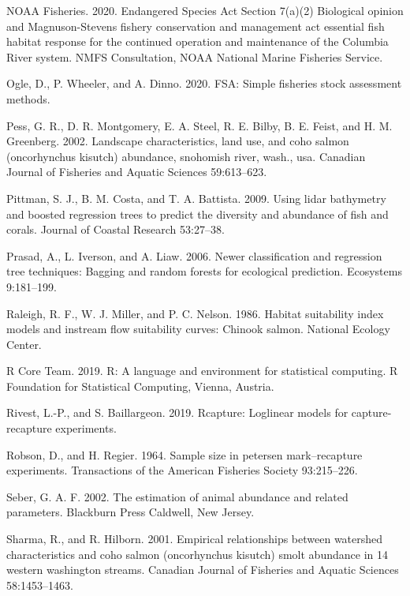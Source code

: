 \documentclass[
  12pt,
]{article}
\begin{document}
\leavevmode\hypertarget{ref-NOAA2020}{}%
NOAA Fisheries. 2020. Endangered Species Act Section 7(a)(2) Biological opinion and Magnuson-Stevens fishery conservation and management act essential fish habitat response for the continued operation and maintenance of the Columbia River system. NMFS Consultation, NOAA National Marine Fisheries Service.

\leavevmode\hypertarget{ref-R-FSA}{}%
Ogle, D., P. Wheeler, and A. Dinno. 2020. FSA: Simple fisheries stock assessment methods.

\leavevmode\hypertarget{ref-Pess2002}{}%
Pess, G. R., D. R. Montgomery, E. A. Steel, R. E. Bilby, B. E. Feist, and H. M. Greenberg. 2002. Landscape characteristics, land use, and coho salmon (oncorhynchus kisutch) abundance, snohomish river, wash., usa. Canadian Journal of Fisheries and Aquatic Sciences 59:613--623.

\leavevmode\hypertarget{ref-Pittman2009}{}%
Pittman, S. J., B. M. Costa, and T. A. Battista. 2009. Using lidar bathymetry and boosted regression trees to predict the diversity and abundance of fish and corals. Journal of Coastal Research 53:27--38.

\leavevmode\hypertarget{ref-Prasad2006}{}%
Prasad, A., L. Iverson, and A. Liaw. 2006. Newer classification and regression tree techniques: Bagging and random forests for ecological prediction. Ecosystems 9:181--199.

\leavevmode\hypertarget{ref-Raleigh1986}{}%
Raleigh, R. F., W. J. Miller, and P. C. Nelson. 1986. Habitat suitability index models and instream flow suitability curves: Chinook salmon. National Ecology Center.

\leavevmode\hypertarget{ref-Rsoftware2019}{}%
R Core Team. 2019. R: A language and environment for statistical computing. R Foundation for Statistical Computing, Vienna, Austria.

\leavevmode\hypertarget{ref-R-Rcapture}{}%
Rivest, L.-P., and S. Baillargeon. 2019. Rcapture: Loglinear models for capture-recapture experiments.

\leavevmode\hypertarget{ref-Robson1964}{}%
Robson, D., and H. Regier. 1964. Sample size in petersen mark--recapture experiments. Transactions of the American Fisheries Society 93:215--226.

\leavevmode\hypertarget{ref-Seber2002}{}%
Seber, G. A. F. 2002. The estimation of animal abundance and related parameters. Blackburn Press Caldwell, New Jersey.

\leavevmode\hypertarget{ref-Sharma2001}{}%
Sharma, R., and R. Hilborn. 2001. Empirical relationships between watershed characteristics and coho salmon (oncorhynchus kisutch) smolt abundance in 14 western washington streams. Canadian Journal of Fisheries and Aquatic Sciences 58:1453--1463.
\end{document}
